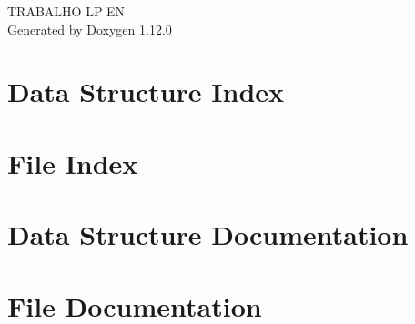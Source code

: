 \documentclass[twoside]{book}
\newcommand{\+}{\discretionary{\mbox{\scriptsize$\hookleftarrow$}}{}{}}
\newcommand{\clearemptydoublepage}{%
    \newpage{\pagestyle{empty}\cleardoublepage}%
  }
\begin{document}
  \raggedbottom
    \hypersetup{pageanchor=false,
                bookmarksnumbered=true,
                pdfencoding=unicode
               }
  \begin{titlepage}
  \vspace*{7cm}
  \begin{center}%
  {\Large TRABALHO LP EN}\\
  \vspace*{1cm}
  {\large Generated by Doxygen 1.12.0}\\
  \end{center}
  \end{titlepage}
  \clearemptydoublepage
  \tableofcontents
  \clearemptydoublepage
  \hypersetup{pageanchor=true}
\chapter{Data Structure Index}

\chapter{File Index}

\chapter{Data Structure Documentation}









\chapter{File Documentation}





























  \backmatter
  \newpage
  \clearemptydoublepage
  \printindex
\end{document}
